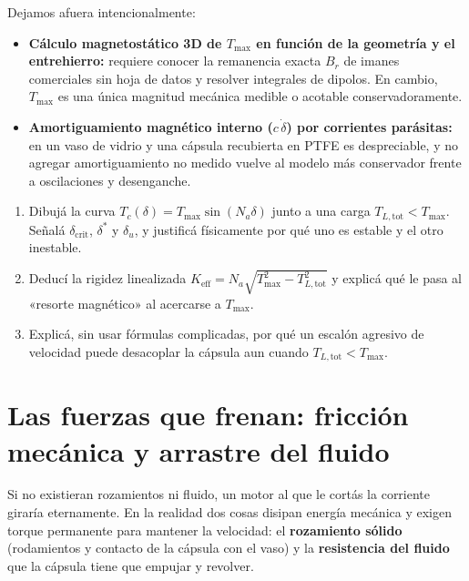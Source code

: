 \documentclass[11pt,a4paper,oneside]{book}
\begin{document}
\begin{antidoto}
Dejamos afuera intencionalmente:
\begin{itemize}
  \item \textbf{Cálculo magnetostático 3D de $T_{\max}$ en función de la
        geometría y el entrehierro:} requiere conocer la remanencia exacta $B_r$
        de imanes comerciales sin hoja de datos y resolver integrales de dipolos.
        En cambio, $T_{\max}$ es una única magnitud mecánica medible o acotable
        conservadoramente.
  \item \textbf{Amortiguamiento magnético interno ($c\,\dot\delta$) por
        corrientes parásitas:} en un vaso de vidrio y una cápsula recubierta en
        PTFE es despreciable, y no agregar amortiguamiento no medido vuelve al
        modelo más conservador frente a oscilaciones y desenganche.
\end{itemize}
\end{antidoto}

\begin{lapizypapel}
\begin{enumerate}[leftmargin=1.5em]
  \item Dibujá la curva $T_c(\delta) = T_{\max}\sin(N_a\delta)$ junto a una
        carga $T_{L,\text{tot}} < T_{\max}$. Señalá $\delta_{\text{crit}}$,
        $\delta^\ast$ y $\delta_u$, y justificá físicamente por qué uno es
        estable y el otro inestable.
  \item Deducí la rigidez linealizada $K_{\text{eff}} = N_a\sqrt{T_{\max}^2 - T_{L,\text{tot}}^2}$
        y explicá qué le pasa al «resorte magnético» al acercarse a $T_{\max}$.
  \item Explicá, sin usar fórmulas complicadas, por qué un escalón agresivo de
        velocidad puede desacoplar la cápsula aun cuando $T_{L,\text{tot}} < T_{\max}$.
\end{enumerate}
\end{lapizypapel}

\chapter{Las fuerzas que frenan: fricción mecánica y arrastre del fluido}\label{cap:cargas}

\begin{ideafisica}
Si no existieran rozamientos ni fluido, un motor al que le cortás la corriente
giraría eternamente. En la realidad dos cosas disipan energía mecánica y exigen
torque permanente para mantener la velocidad: el \textbf{rozamiento sólido}
(rodamientos y contacto de la cápsula con el vaso) y la \textbf{resistencia del
fluido} que la cápsula tiene que empujar y revolver.
\end{ideafisica}
\end{document}
